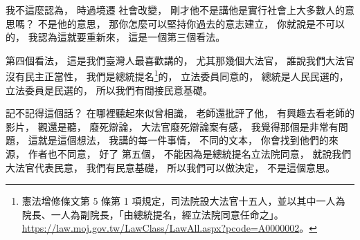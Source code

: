 \hypertarget{w06:cue:2861}{}我不這麼認為，
\hypertarget{w06:cue:2862}{}時過境遷 社會改變，
\hypertarget{w06:cue:2863}{}剛才他不是講他是實行社會上大多數人的意思嗎？
\hypertarget{w06:cue:2864}{}不是他的意思，
\hypertarget{w06:cue:2865}{}那你怎麼可以堅持你過去的意志建立，
\hypertarget{w06:cue:2866}{}你就說是不可以的，
\hypertarget{w06:cue:2867}{}我認為這就要重新來，
\hypertarget{w06:cue:2868}{}這是一個第三個看法。

\hypertarget{w06:cue:2869}{}第四個看法，
\hypertarget{w06:cue:2870}{}這是我們臺灣人最喜歡講的，
\hypertarget{w06:cue:2871}{}尤其那幾個大法官，
\hypertarget{w06:cue:2872}{}誰說我們大法官沒有民主正當性，
\hypertarget{w06:cue:2873}{}我們是總統提名\footnote{憲法增修條文第 5 條第 1 項規定，司法院設大法官十五人，並以其中一人為院長、一人為副院長，「由總統提名，經立法院同意任命之」。\url{https://law.moj.gov.tw/LawClass/LawAll.aspx?pcode=A0000002}。}的，
\hypertarget{w06:cue:2874}{}立法委員同意的，
\hypertarget{w06:cue:2875}{}總統是人民民選的，
\hypertarget{w06:cue:2876}{}立法委員是民選的，
\hypertarget{w06:cue:2877}{}所以我們有間接民意基礎。

\hypertarget{w06:cue:2878}{}記不記得這個話？
\hypertarget{w06:cue:2879}{}在哪裡聽起來似曾相識，
\hypertarget{w06:cue:2880}{}老師還批評了他，
\hypertarget{w06:cue:2881}{}有興趣去看老師的影片，
\hypertarget{w06:cue:2882}{}觀還是聽，
\hypertarget{w06:cue:2883}{}廢死辯論，
\hypertarget{w06:cue:2884}{}大法官廢死辯論案有感，
\hypertarget{w06:cue:2885}{}我覺得那個是非常有問題，
\hypertarget{w06:cue:2886}{}這就是這個想法，
\hypertarget{w06:cue:2887}{}我講的每一件事情，
\hypertarget{w06:cue:2888}{}不同的文本，
\hypertarget{w06:cue:2889}{}你會找到他們的來源，
\hypertarget{w06:cue:2890}{}作者也不同意，
\hypertarget{w06:cue:2891}{}好了 第五個，
\hypertarget{w06:cue:2892}{}不能因為是總統提名立法院同意，
\hypertarget{w06:cue:2893}{}就說我們大法官代表民意，
\hypertarget{w06:cue:2894}{}我們有民意基礎，
\hypertarget{w06:cue:2895}{}所以我們可以做決定，
\hypertarget{w06:cue:2896}{}不是這個意思。

